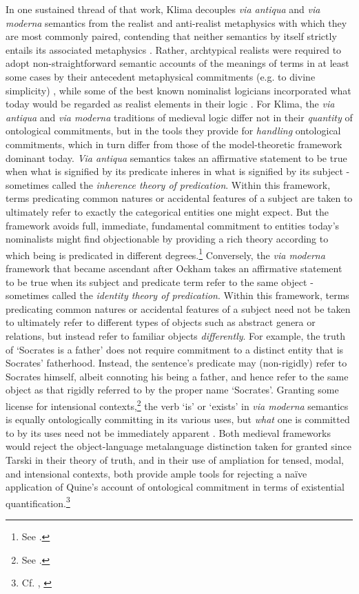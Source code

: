 \documentclass[]{article}
\begin{document}
In one sustained thread of that work, 
Klima decouples \emph{via antiqua} and \emph{via moderna} semantics 
from the realist and anti-realist metaphysics with which they are most commonly paired,
contending that neither semantics by itself strictly entails its associated metaphysics \autocite{Klima1999,Klima2011}. 
Rather, archtypical realists were required to adopt non-straightforward semantic accounts of the meanings of terms in at least some cases by their antecedent metaphysical commitments (e.g. to divine simplicity) \autocite{Klima2002b},
while some of the best known nominalist logicians incorporated what today would be regarded as realist elements in their logic \autocite{Klima2005}. 
For Klima, the \emph{via antiqua} and \emph{via moderna} traditions of medieval logic 
differ not in their \emph{quantity} of ontological commitments, 
but in the tools they provide for \emph{handling} ontological commitments, 
which in turn differ from those of the model-theoretic framework dominant today. 
\emph{Via antiqua} semantics takes an affirmative statement to be true when what is signified by its predicate inheres in what is signified by its subject - 
sometimes called the \emph{inherence theory of predication}. 
Within this framework, 
terms predicating common natures or accidental features of a subject are taken to ultimately refer to exactly the categorical entities one might expect. 
But the framework 
avoids full, immediate, fundamental commitment to entities today's nominalists might find objectionable by providing a rich theory according to which being is predicated in different degrees.\footnote{See \autocite{Klima2002}.}
Conversely, the \emph{via moderna} framework that became ascendant after Ockham 
takes an affirmative statement to be true when its subject and predicate term refer to the same object 
 - sometimes called the \emph{identity theory of predication}. 
Within this framework, 
terms predicating common natures or accidental features of a subject need not be taken to ultimately refer to different types of objects such as abstract genera or relations, 
but instead refer to familiar objects \emph{differently}. 
For example, the truth of `Socrates is a father' does not require commitment to a distinct entity that is Socrates' fatherhood.
Instead, the sentence's predicate may (non-rigidly) refer to Socrates himself, 
albeit connoting his being a father, 
and hence refer to the same object as that rigidly referred to by the proper name `Socrates'. 
Granting some license for intensional contexts,\footnote{See \autocite{Klima2005}.} 
the verb `is' or `exists' in \emph{via moderna} semantics is equally ontologically committing in its various uses, 
but \emph{what} one is committed to by its uses need not be immediately apparent  \autocite[437-430]{Klima2008a}. 
Both medieval frameworks would reject the object-language metalanguage distinction taken for granted since Tarski in their theory of truth, 
and 
in their use of ampliation for tensed, modal, and intensional contexts,
both provide ample tools for rejecting a na\"{i}ve application of Quine's account of ontological commitment in terms of existential quantification.\footnote{Cf. \autocite{Klima2004}, 
\autocite[171-174]{Klima2009}}
\end{document}
